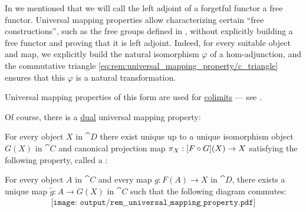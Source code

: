\begin{remark}
  In  we mentioned that we will call the left adjoint of a forgetful functor a free functor. Universal mapping properties allow characterizing certain \enquote{free constructions}, such as the free groups defined in , without explicitly building a free functor and proving that it is left adjoint. Indeed, for every suitable object and map, we explicitly build the natural isomorphism \( \varphi \) of a hom-adjunction, and the commutative triangle \eqref{eq:rem:universal_mapping_property/c_triangle} ensures that this \( \varphi \) is a natural transformation.

  Universal mapping properties of this form are used for \hyperref[def:category_of_cones/colimit]{colimits} --- see .

  Of course, there is a \hyperref[thm:categorical_principle_of_duality]{dual} universal mapping property:
  \begin{displayquote}
    For every object \( X \) in \( \cat{D} \) there exist unique up to a unique isomorphism object \( G(X) \) in \( \cat{C} \) and canonical projection map \( \pi_X: [F \bincirc G](X) \to X \) satisfying the following property, called a :
    \begin{displayquote}
      For every object \( A \) in \( \cat{C} \) and every map \( g: F(A) \to X \) in \( \cat{D} \), there exists a unique map \( \widetilde{g}: A \to G(X) \) in \( \cat{C} \) such that the following diagram commutes:
      \begin{equation}\label{eq:rem:universal_mapping_property/d_triangle}
        \begin{aligned}
          \texttt{[image: output/rem\_\_universal\_mapping\_property.pdf]}
        \end{aligned}
      \end{equation}
    \end{displayquote}
  \end{displayquote}


\end{remark}
